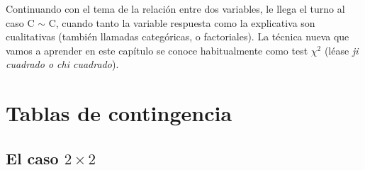 ﻿%

Continuando con el tema de la relación entre dos variables, le llega el turno al caso C $\sim$ C, cuando tanto la variable respuesta como la explicativa son cualitativas (también llamadas categóricas, o factoriales). La técnica nueva que vamos a aprender en este capítulo se conoce habitualmente como test $\chi^2$ (léase {\em ji cuadrado o chi cuadrado}).



\section{Tablas de contingencia}

\subsection{El caso $2\times 2$}
